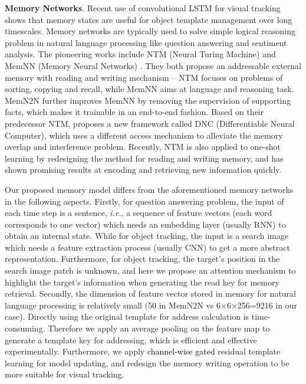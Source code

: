 \documentclass[runningheads]{llncs}
\newcommand{\yty}[1]{\textcolor{black}{#1}}
\newcommand{\abc}[1]{\textcolor{black}{#1}}
\begin{document}
\textbf{Memory Networks}. Recent use of convolutional LSTM for visual tracking \cite{Yang2017} shows that memory states %
are useful for object template management over long timescales. Memory networks are typically used to solve simple logical reasoning problem in natural language processing like question answering and sentiment analysis. The pioneering works include NTM (Neural Turing Machine) \cite{Graves2014} and MemNN (Memory Neural Networks) \cite{Weston2015}. They both propose an addressable external memory with reading and writing mechanism -- NTM focuses on problems of sorting, copying and recall, while MemNN aims at language and reasoning task. MemN2N %
\cite{Sukhbaatar2015} further improves MemNN by removing the supervision of supporting facts, which makes it trainable in an end-to-end fashion. Based on their predecessor NTM, %
\cite{Graves2016} proposes a new framework called DNC (Differentiable Neural Computer), which uses a different access mechanism to alleviate the memory overlap and interference problem.
Recently, NTM is also applied to one-shot learning \cite{Santoro2016} by redesigning the method for reading and writing memory, and has shown promising results at %
encoding and retrieving new information quickly. 

Our proposed memory model differs from the aforementioned memory networks in the following aspects. Firstly, for question answering problem, the input of each time step is a sentence,
\emph{i.e.}, a sequence of feature vectors (each word corresponds to one vector) which needs an embedding layer (usually RNN) to obtain an internal state. While for object tracking, the input is a search image which needs a feature extraction process (usually CNN) to get a more abstract representation. Furthermore, for object tracking, the target's position in the search image patch is unknown, and here we propose an attention mechanism to highlight the target's information when generating the read key for memory retrieval. 
%
%
Secondly, the dimension of feature vector stored in memory for natural language processing is relatively small (50 in MemN2N vs 6$\times$6$\times$256=9216 in our case). %
Directly using the original template for address calculation is time-consuming.  Therefore we apply an average pooling on the feature map to generate a template key for addressing, which is efficient and effective experimentally. 
Furthermore, we apply \abc{channel-wise gated} residual template learning for model updating, and redesign the memory writing operation %
to be more suitable for visual tracking.
\end{document}
